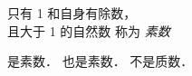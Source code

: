 \begin{definition}
  只有 1 和自身有除数，\\
  且大于 1 的自然数
  称为 \emph{素数}
\end{definition}

\begin{example}   
  \begin{itemize}
     是素数．
     也是素数．
     不是质数．
  \end{itemize}
\end{example}

